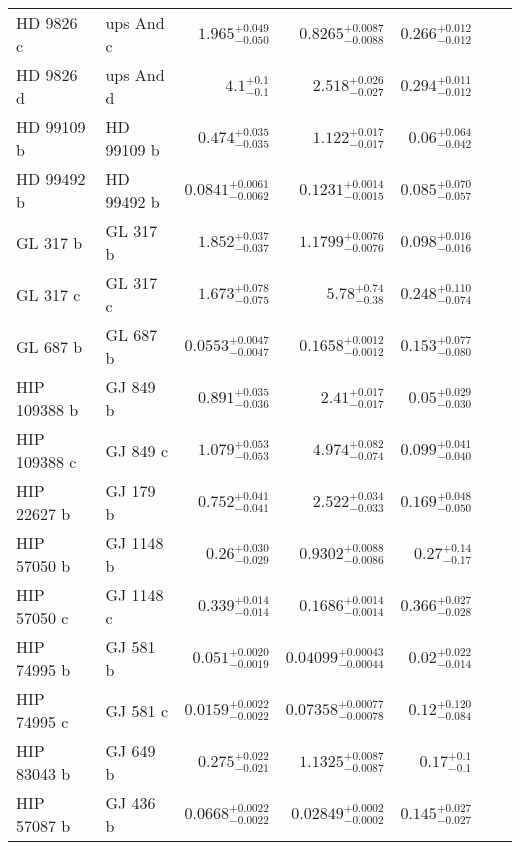 \begin{longtable*}{llrrrrr}
HD 9826 c & ups And c & $1.965^{+0.049}_{-0.050}$ & $0.8265^{+0.0087}_{-0.0088}$ & $0.266^{+0.012}_{-0.012}$ & \cite{Naef04} & \\
HD 9826 d & ups And d & $4.1^{+0.1}_{-0.1}$ & $2.518^{+0.026}_{-0.027}$ & $0.294^{+0.011}_{-0.012}$ & \cite{Naef04} & \\
HD 99109 b & HD 99109 b & $0.474^{+0.035}_{-0.035}$ & $1.122^{+0.017}_{-0.017}$ & $0.06^{+0.064}_{-0.042}$ & \cite{Butler06} & \\
HD 99492 b & HD 99492 b & $0.0841^{+0.0061}_{-0.0062}$ & $0.1231^{+0.0014}_{-0.0015}$ & $0.085^{+0.070}_{-0.057}$ & \cite{Marcy05} & \\
GL 317 b & GL 317 b & $1.852^{+0.037}_{-0.037}$ & $1.1799^{+0.0076}_{-0.0076}$ & $0.098^{+0.016}_{-0.016}$ & \cite{Johnson07b} & \\
GL 317 c & GL 317 c & $1.673^{+0.078}_{-0.075}$ & $5.78^{+0.74}_{-0.38}$ & $0.248^{+0.110}_{-0.074}$ & \cite{Anglada-Escude12} & \\
GL 687 b & GL 687 b & $0.0553^{+0.0047}_{-0.0047}$ & $0.1658^{+0.0012}_{-0.0012}$ & $0.153^{+0.077}_{-0.080}$ & \cite{Burt14} & \\
HIP 109388 b & GJ 849 b & $0.891^{+0.035}_{-0.036}$ & $2.41^{+0.017}_{-0.017}$ & $0.05^{+0.029}_{-0.030}$ & \cite{Butler06_GJ849} & \\
HIP 109388 c & GJ 849 c & $1.079^{+0.053}_{-0.053}$ & $4.974^{+0.082}_{-0.074}$ & $0.099^{+0.041}_{-0.040}$ & \cite{Feng15} & \\
HIP 22627 b & GJ 179 b & $0.752^{+0.041}_{-0.041}$ & $2.522^{+0.034}_{-0.033}$ & $0.169^{+0.048}_{-0.050}$ & \cite{Howard10} & \\
HIP 57050 b & GJ 1148 b & $0.26^{+0.030}_{-0.029}$ & $0.9302^{+0.0088}_{-0.0086}$ & $0.27^{+0.14}_{-0.17}$ & \cite{Haghighipour10} & \\
HIP 57050 c & GJ 1148 c & $0.339^{+0.014}_{-0.014}$ & $0.1686^{+0.0014}_{-0.0014}$ & $0.366^{+0.027}_{-0.028}$ & \cite{Trifonov17} & \\
HIP 74995 b & GJ 581 b & $0.051^{+0.0020}_{-0.0019}$ & $0.04099^{+0.00043}_{-0.00044}$ & $0.02^{+0.022}_{-0.014}$ & \cite{Bonfils05} & \\
HIP 74995 c & GJ 581 c & $0.0159^{+0.0022}_{-0.0022}$ & $0.07358^{+0.00077}_{-0.00078}$ & $0.12^{+0.120}_{-0.084}$ & \cite{Mayor09} & \\
HIP 83043 b & GJ 649 b & $0.275^{+0.022}_{-0.021}$ & $1.1325^{+0.0087}_{-0.0087}$ & $0.17^{+0.1}_{-0.1}$ & \cite{Johnson10} & \\
HIP 57087 b & GJ 436 b & $0.0668^{+0.0022}_{-0.0022}$ & $0.02849^{+0.0002}_{-0.0002}$ & $0.145^{+0.027}_{-0.027}$ & \cite{Butler04} & \\

\end{longtable*}
